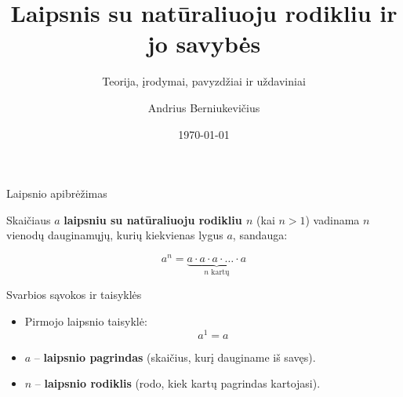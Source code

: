 \documentclass[aspectratio=169,10pt]{beamer}
\title[Laipsniai su natūraliuoju rodikliu]
{Laipsnis su natūraliuoju rodikliu ir jo savybės}
\subtitle{Teorija, įrodymai, pavyzdžiai ir uždaviniai}
\author[A. Berniukevičius]{Andrius Berniukevičius}
\date{\today}
\newcommand{\vocab}[1]{\textbf{\color{structure.fg}#1}}
\begin{document}


\begin{frame}
    \titlepage
\end{frame}


\begin{frame}{Laipsnio apibrėžimas}

    \begin{definition}

        Skaičiaus $a$ \vocab{laipsniu su natūraliuoju rodikliu $n$}
        (kai $n>1$) vadinama $n$ vienodų dauginamųjų,
        kurių kiekvienas lygus $a$, sandauga:

        \[
        a^n
        =
        \underbrace{
        a\cdot a\cdot a\cdot\dots\cdot a
        }_{n\text{ kartų}}
        \]

    \end{definition}

    \vspace{0.2cm}

    \begin{block}{Svarbios sąvokos ir taisyklės}

        \begin{itemize}

            \item Pirmojo laipsnio taisyklė:
            \[
            a^1=a
            \]

            \item
            \textbf{$a$} – \vocab{laipsnio pagrindas}
            (skaičius, kurį dauginame iš savęs).

            \item
            \textbf{$n$} – \vocab{laipsnio rodiklis}
            (rodo, kiek kartų pagrindas kartojasi).

        \end{itemize}

    \end{block}

\end{frame}
\end{document}
